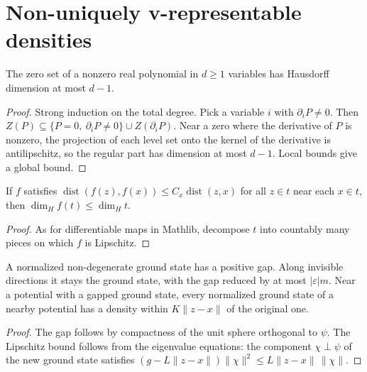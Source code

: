 \section{Non-uniquely v-representable densities}

\begin{theorem}
  \label{thm:dimH_zeroSet}
  \leanok
  The zero set of a nonzero real polynomial in $d\ge1$ variables has Hausdorff dimension at most $d-1$.
\end{theorem}
\begin{proof}
  \leanok
  Strong induction on the total degree. Pick a variable $i$ with $\partial_iP\ne0$. Then
  $Z(P)\subseteq\{P=0,\ \partial_iP\ne0\}\cup Z(\partial_iP)$. Near a zero where the derivative of $P$ is
  nonzero, the projection of each level set onto the kernel of the derivative is antilipschitz, so the
  regular part has dimension at most $d-1$. Local bounds give a global bound.
\end{proof}

\begin{theorem}
  \label{thm:dimH_pointwise_lipschitz}
  \leanok
  If $f$ satisfies $\operatorname{dist}(f(z),f(x))\le C_x\operatorname{dist}(z,x)$ for all $z\in t$ near each
  $x\in t$, then $\dim_H f(t)\le\dim_H t$.
\end{theorem}
\begin{proof}
  \leanok
  As for differentiable maps in Mathlib, decompose $t$ into countably many pieces on which $f$ is Lipschitz.
\end{proof}

\begin{lemma}
  \label{lem:density_gap}
  \leanok
  A normalized non-degenerate ground state has a positive gap. Along invisible directions it stays the
  ground state, with the gap reduced by at most $|\varepsilon|m$. Near a potential with a gapped ground
  state, every normalized ground state of a nearby potential has a density within $K\|z-x\|$ of the
  original one.
\end{lemma}
\begin{proof}
  \leanok
  The gap follows by compactness of the unit sphere orthogonal to $\psi$. The Lipschitz bound follows from the
  eigenvalue equations: the component $\chi\perp\psi$ of the new ground state satisfies
  $(g-L\|z-x\|)\|\chi\|^2\le L\|z-x\|\,\|\chi\|$.
\end{proof}

